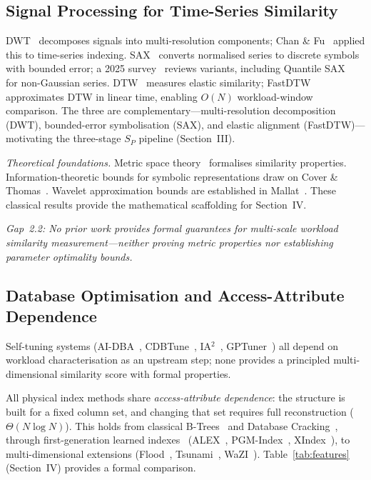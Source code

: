 \documentclass[10pt,twocolumn,a4paper]{article}
\newcommand{\SPER}{S_{P}}
\begin{document}
\subsection{Signal Processing for Time-Series Similarity}

DWT~\cite{Daubechies1992Wavelets} decomposes signals into
multi-resolution components; Chan \& Fu~\cite{Chan2003Wavelets} applied
this to time-series indexing. SAX~\cite{Lin2007SAX} converts normalised
series to discrete symbols with bounded error; a 2025 survey~\cite{Pappa2025SAXSurvey}
reviews variants, including Quantile SAX~\cite{Silveira2023QuantileSAX}
for non-Gaussian series. DTW~\cite{Sakoe1978DTW} measures elastic
similarity; FastDTW~\cite{Salvador2007FastDTW} approximates DTW in linear
time, enabling $O(N)$ workload-window comparison. The three are complementary---multi-resolution decomposition (DWT),
bounded-error symbolisation (SAX), and elastic alignment
(FastDTW)---motivating the three-stage $\SPER$ pipeline
(Section~III).

\textit{Theoretical foundations.} Metric space theory~\cite{Deza2009Distances}
formalises similarity properties. Information-theoretic bounds for
symbolic representations draw on Cover \& Thomas~\cite{Cover2006InfoTheory}.
Wavelet approximation bounds are established in Mallat~\cite{Mallat1989Wavelets}.
These classical results provide the mathematical scaffolding for Section~IV.

\smallskip\noindent\emph{Gap~2.2: No prior work provides formal guarantees
for multi-scale workload similarity measurement---neither proving metric
properties nor establishing parameter optimality bounds.}

\subsection{Database Optimisation and Access-Attribute Dependence}

Self-tuning systems (AI-DBA~\cite{Li2022AIDBA}, CDBTune~\cite{Zhang2019CDBTune},
IA$^2$~\cite{Xu2024IA2}, GPTuner~\cite{Lao2024GPTuner}) all depend on
workload characterisation as an upstream step; none provides a principled
multi-dimensional similarity score with formal properties.

All physical index methods share \emph{access-attribute dependence}:
the structure is built for a fixed column set, and changing that set
requires full reconstruction ($\Theta(N\log N)$). This holds from
classical B-Trees~\cite{Ramakrishnan2003DMS} and Database
Cracking~\cite{Idreos2011Cracking}, through first-generation
learned indexes~\cite{Kraska2018LearnedIndex} (ALEX~\cite{Ding2020ALEX},
PGM-Index~\cite{Ferragina2020PGM}, XIndex~\cite{Tang2020XIndex}),
to multi-dimensional extensions
(Flood~\cite{Nathan2020Flood}, Tsunami~\cite{Ding2020Tsunami},
WaZI~\cite{Pai2024WaZI}).
Table~\ref{tab:features} (Section~IV) provides a formal comparison.
\end{document}
